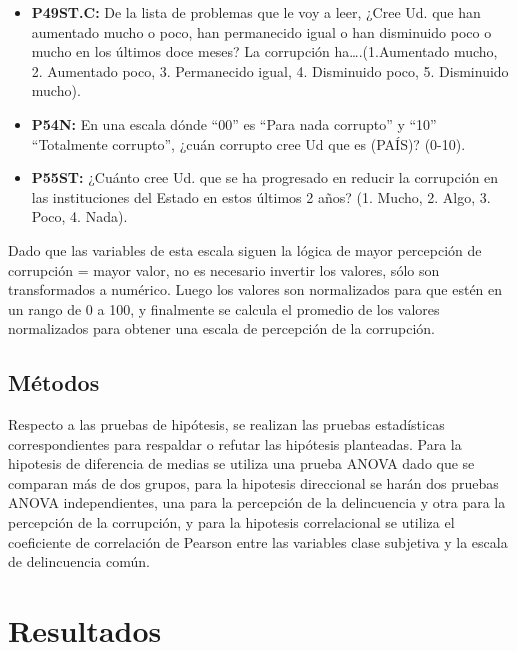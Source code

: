 \documentclass[
  spanish,
  a4paper,
  oneside]{scrbook}
\providecommand{\tightlist}{%
  \setlength{\itemsep}{0pt}\setlength{\parskip}{0pt}}
\begin{document}
\begin{itemize}
\tightlist
\item
  \textbf{P49ST.C:} De la lista de problemas que le voy a leer, ¿Cree
  Ud. que han aumentado mucho o poco, han permanecido igual o han
  disminuido poco o mucho en los últimos doce meses? La corrupción
  ha\ldots.(1.Aumentado mucho, 2. Aumentado poco, 3. Permanecido igual,
  4. Disminuido poco, 5. Disminuido mucho).
\item
  \textbf{P54N:} En una escala dónde ``00'' es ``Para nada corrupto'' y
  ``10'' ``Totalmente corrupto'', ¿cuán corrupto cree Ud que es (PAÍS)?
  (0-10).
\item
  \textbf{P55ST:} ¿Cuánto cree Ud. que se ha progresado en reducir la
  corrupción en las instituciones del Estado en estos últimos 2 años?
  (1. Mucho, 2. Algo, 3. Poco, 4. Nada).
\end{itemize}

Dado que las variables de esta escala siguen la lógica de mayor
percepción de corrupción = mayor valor, no es necesario invertir los
valores, sólo son transformados a numérico. Luego los valores son
normalizados para que estén en un rango de 0 a 100, y finalmente se
calcula el promedio de los valores normalizados para obtener una escala
de percepción de la corrupción.

\section{Métodos}\label{muxe9todos-1}

Respecto a las pruebas de hipótesis, se realizan las pruebas
estadísticas correspondientes para respaldar o refutar las hipótesis
planteadas. Para la hipotesis de diferencia de medias se utiliza una
prueba ANOVA dado que se comparan más de dos grupos, para la hipotesis
direccional se harán dos pruebas ANOVA independientes, una para la
percepción de la delincuencia y otra para la percepción de la
corrupción, y para la hipotesis correlacional se utiliza el coeficiente
de correlación de Pearson entre las variables clase subjetiva y la
escala de delincuencia común.


\chapter{Resultados}\label{resultados}
\end{document}
